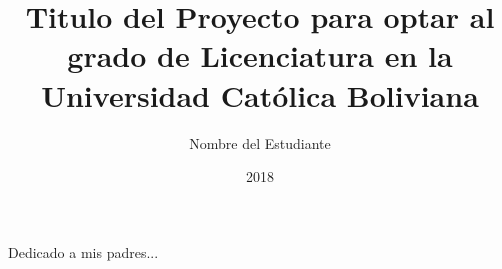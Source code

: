 \documentclass[upright, contnum, hidelinks,times]{ucbcba}
\author{Nombre del Estudiante}
\title{\textbf{Titulo del Proyecto para optar al grado de Licenciatura en la Universidad Cat\'olica Boliviana}}
\date{2018}
\newcommand{\bibtexdb}{referencias}
\begin{document}
\frontmatter
\maketitle

\begin{resumen}
\lipsum[3-4]
\end{resumen}



\begin{abstract}
\lipsum[3-4]
\end{abstract}

\begin{dedicatoria}
Dedicado a mis padres...
\end{dedicatoria}

\begin{agradecimientos}
\lipsum[1-2]

\end{agradecimientos}

\renewcommand*\contentsname{\hfill Indice General \hfill}
\tableofcontents

\listoftables
\renewcommand\listtablename{Lista de Tablas}

\renewcommand\listfigurename{Lista de Figuras}
\listoffigures

\mainmatter



\nocite{*}



\renewcommand\appendixtocname{Apendices}
\renewcommand\appendixpagename{Apendices}
\begin{appendices}
\lipsum[1-2]
\end{appendices}
\end{document}
